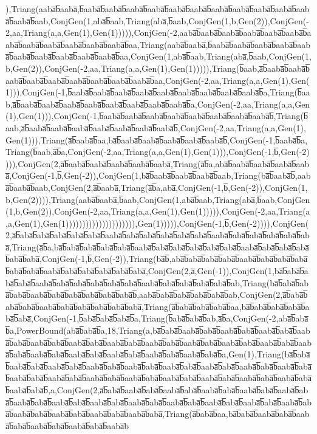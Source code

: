 ),Triang(aaba̅b̅aaba̅,b̅aaba̅b̅aaba̅b̅aaba̅b̅aaba̅b̅aaba̅b̅aaba̅b̅aaba̅b̅aaba̅b̅aaba̅b̅aaba̅b̅aaba̅b̅aaba̅b̅aab,ConjGen(1,aba̅b̅aab,Triang(aba̅,b̅aab,ConjGen(1,b,Gen(2)),ConjGen(-2,aa,Triang(a,a,Gen(1),Gen(1))))),ConjGen(-2,aaba̅b̅aaba̅b̅aaba̅b̅aaba̅b̅aaba̅b̅aaba̅b̅aaba̅b̅aaba̅b̅aaba̅b̅aaba̅b̅aaba̅b̅aaba̅b̅aa,Triang(aaba̅b̅aaba̅,b̅aaba̅b̅aaba̅b̅aaba̅b̅aaba̅b̅aaba̅b̅aaba̅b̅aaba̅b̅aaba̅b̅aaba̅b̅aaba̅b̅aa,ConjGen(1,aba̅b̅aab,Triang(aba̅,b̅aab,ConjGen(1,b,Gen(2)),ConjGen(-2,aa,Triang(a,a,Gen(1),Gen(1))))),Triang(b̅aab,a̅b̅aaba̅b̅aaba̅b̅aaba̅b̅aaba̅b̅aaba̅b̅aaba̅b̅aaba̅b̅aaba̅b̅aaba̅b̅aa,ConjGen(-2,aa,Triang(a,a,Gen(1),Gen(1))),ConjGen(-1,b̅aaba̅b̅aaba̅b̅aaba̅b̅aaba̅b̅aaba̅b̅aaba̅b̅aaba̅b̅aaba̅b̅aaba̅b̅a,Triang(b̅aab,a̅b̅aaba̅b̅aaba̅b̅aaba̅b̅aaba̅b̅aaba̅b̅aaba̅b̅aaba̅b̅aaba̅b̅a,ConjGen(-2,aa,Triang(a,a,Gen(1),Gen(1))),ConjGen(-1,b̅aaba̅b̅aaba̅b̅aaba̅b̅aaba̅b̅aaba̅b̅aaba̅b̅aaba̅b̅aaba̅b̅,Triang(b̅aab,a̅b̅aaba̅b̅aaba̅b̅aaba̅b̅aaba̅b̅aaba̅b̅aaba̅b̅aaba̅b̅,ConjGen(-2,aa,Triang(a,a,Gen(1),Gen(1))),Triang(a̅b̅aaba̅b̅aa,ba̅b̅aaba̅b̅aaba̅b̅aaba̅b̅aaba̅b̅aaba̅b̅,ConjGen(-1,b̅aaba̅b̅a,Triang(b̅aab,a̅b̅a,ConjGen(-2,aa,Triang(a,a,Gen(1),Gen(1))),ConjGen(-1,b̅,Gen(-2)))),ConjGen(2,a̅b̅aaba̅b̅aaba̅b̅aaba̅b̅aaba̅b̅aaba̅,Triang(a̅b̅a,aba̅b̅aaba̅b̅aaba̅b̅aaba̅b̅aaba̅,ConjGen(-1,b̅,Gen(-2)),ConjGen(1,ba̅b̅aaba̅b̅aaba̅b̅aaba̅b̅aab,Triang(ba̅b̅aaba̅b̅,aaba̅b̅aaba̅b̅aab,ConjGen(2,a̅b̅aaba̅,Triang(a̅b̅a,aba̅,ConjGen(-1,b̅,Gen(-2)),ConjGen(1,b,Gen(2)))),Triang(aaba̅b̅aaba̅,b̅aab,ConjGen(1,aba̅b̅aab,Triang(aba̅,b̅aab,ConjGen(1,b,Gen(2)),ConjGen(-2,aa,Triang(a,a,Gen(1),Gen(1))))),ConjGen(-2,aa,Triang(a,a,Gen(1),Gen(1))))))))))))))))))))),Gen(1))))),ConjGen(-1,b̅,Gen(-2)))),ConjGen(2,a̅b̅aba̅b̅aba̅b̅aba̅b̅aba̅b̅aba̅b̅aaba̅b̅aba̅b̅aba̅b̅aba̅b̅aba̅b̅aba̅b̅aaba̅b̅aba̅b̅aba̅b̅aba̅b̅aba̅b̅aba̅,Triang(a̅b̅a,ba̅b̅aba̅b̅aba̅b̅aba̅b̅aba̅b̅aaba̅b̅aba̅b̅aba̅b̅aba̅b̅aba̅b̅aba̅b̅aaba̅b̅aba̅b̅aba̅b̅aba̅b̅aba̅b̅aba̅,ConjGen(-1,b̅,Gen(-2)),Triang(ba̅b̅,aba̅b̅aba̅b̅aba̅b̅aba̅b̅aaba̅b̅aba̅b̅aba̅b̅aba̅b̅aba̅b̅aba̅b̅aaba̅b̅aba̅b̅aba̅b̅aba̅b̅aba̅b̅aba̅,ConjGen(2,a̅,Gen(-1)),ConjGen(1,ba̅b̅aba̅b̅aba̅b̅aba̅b̅aaba̅b̅aba̅b̅aba̅b̅aba̅b̅aba̅b̅aba̅b̅aaba̅b̅aba̅b̅aba̅b̅aba̅b̅aba̅b̅ab,Triang(ba̅b̅aba̅b̅aba̅b̅aba̅b̅aaba̅b̅aba̅b̅aba̅b̅aba̅b̅aba̅b̅aba̅b̅,aaba̅b̅aba̅b̅aba̅b̅aba̅b̅aba̅b̅ab,ConjGen(2,a̅b̅aba̅b̅aba̅b̅aba̅b̅aaba̅b̅aba̅b̅aba̅b̅aba̅b̅aba̅b̅aba̅,Triang(a̅b̅aba̅b̅aba̅b̅aba̅b̅aa,ba̅b̅aba̅b̅aba̅b̅aba̅b̅aba̅b̅aba̅,ConjGen(-1,b̅aba̅b̅aba̅b̅aba̅b̅a,Triang(b̅aba̅b̅aba̅b̅ab,a̅b̅a,ConjGen(-2,aba̅b̅aba̅b̅a,PowerBound(aba̅b̅aba̅b̅a,18,Triang(a,ba̅b̅aba̅b̅aaba̅b̅aba̅b̅aaba̅b̅aba̅b̅aaba̅b̅aba̅b̅aaba̅b̅aba̅b̅aaba̅b̅aba̅b̅aaba̅b̅aba̅b̅aaba̅b̅aba̅b̅aaba̅b̅aba̅b̅aaba̅b̅aba̅b̅aaba̅b̅aba̅b̅aaba̅b̅aba̅b̅aaba̅b̅aba̅b̅aaba̅b̅aba̅b̅aaba̅b̅aba̅b̅aaba̅b̅aba̅b̅aaba̅b̅aba̅b̅aaba̅b̅aba̅b̅a,Gen(1),Triang(ba̅b̅aba̅b̅aaba̅b̅aba̅b̅aaba̅b̅aba̅b̅aaba̅b̅aba̅b̅aaba̅b̅aba̅b̅aaba̅b̅aba̅b̅aaba̅b̅aba̅b̅aaba̅b̅aba̅b̅aaba̅b̅aba̅b̅aaba̅b̅aba̅b̅aaba̅b̅aba̅b̅aaba̅b̅aba̅b̅aaba̅b̅aba̅b̅aaba̅b̅aba̅b̅aaba̅b̅aba̅b̅aaba̅b̅aba̅b̅aaba̅b̅aba̅b̅aaba̅b̅aba̅b̅,a,ConjGen(2,a̅b̅aba̅b̅aaba̅b̅aba̅b̅aaba̅b̅aba̅b̅aaba̅b̅aba̅b̅aaba̅b̅aba̅b̅aaba̅b̅aba̅b̅aaba̅b̅aba̅b̅aaba̅b̅aba̅b̅aaba̅b̅aba̅b̅aaba̅b̅aba̅b̅aaba̅b̅aba̅b̅aaba̅b̅aba̅b̅aaba̅b̅aba̅b̅aaba̅b̅aba̅b̅aaba̅b̅aba̅b̅aaba̅b̅aba̅b̅aaba̅b̅aba̅b̅aaba̅b̅aba̅,Triang(a̅b̅aba̅b̅aa,ba̅b̅aba̅b̅aaba̅b̅aba̅b̅aaba̅b̅aba̅b̅aaba̅b̅aba̅b̅aaba̅b̅aba̅b̅aaba̅b